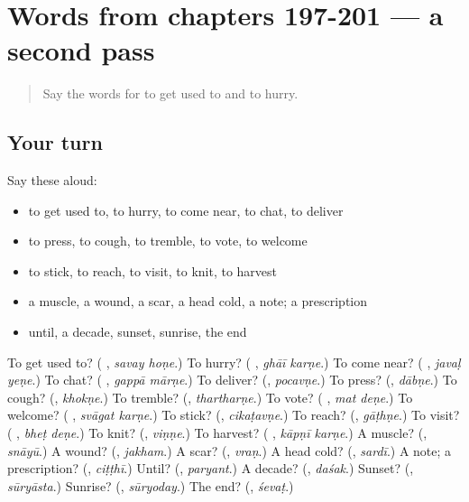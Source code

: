 \section[(dialogue)]{Words from chapters 197-201 — a second pass}

\label{lesson:MR-R201-second-pass-words-from-chapters-197-201}



\begin{quote}
Say the words for to get used to and to hurry.
\end{quote}

\subsection*{Your turn}
Say these aloud:

\begin{itemize}
\raggedright
  \item to get used to, to hurry, to come near, to chat, to deliver
  \item to press, to cough, to tremble, to vote, to welcome
  \item to stick, to reach, to visit, to knit, to harvest
  \item a muscle, a wound, a scar, a head cold, a note; a prescription
  \item until, a decade, sunset, sunrise, the end
\end{itemize}

\begin{tcolorbox}[breakable,colback=teal!4,colframe=teal!35!black,title={Before you move on}]
To get used to? (\textbf{ }, \emph{savay hoṇe}.) To hurry? (\textbf{ }, \emph{ghāī karṇe}.) To come near? (\textbf{ }, \emph{javaḷ yeṇe}.) To chat? (\textbf{ }, \emph{gappā mārṇe}.) To deliver? (\textbf{}, \emph{pocavṇe}.) To press? (\textbf{}, \emph{dābṇe}.) To cough? (\textbf{}, \emph{khokṇe}.) To tremble? (\textbf{}, \emph{thartharṇe}.) To vote? (\textbf{ }, \emph{mat deṇe}.) To welcome? (\textbf{ }, \emph{svāgat karṇe}.) To stick? (\textbf{}, \emph{cikaṭavṇe}.) To reach? (\textbf{}, \emph{gāṭhṇe}.) To visit? (\textbf{ }, \emph{bheṭ deṇe}.) To knit? (\textbf{}, \emph{viṇṇe}.) To harvest? (\textbf{ }, \emph{kāpṇī karṇe}.) A muscle? (\textbf{}, \emph{snāyū}.) A wound? (\textbf{}, \emph{jakham}.) A scar? (\textbf{}, \emph{vraṇ}.) A head cold? (\textbf{}, \emph{sardī}.) A note; a prescription? (\textbf{}, \emph{ciṭṭhī}.) Until? (\textbf{}, \emph{paryant}.) A decade? (\textbf{}, \emph{daśak}.) Sunset? (\textbf{}, \emph{sūryāsta}.) Sunrise? (\textbf{}, \emph{sūryoday}.) The end? (\textbf{}, \emph{śevaṭ}.)
\end{tcolorbox}
